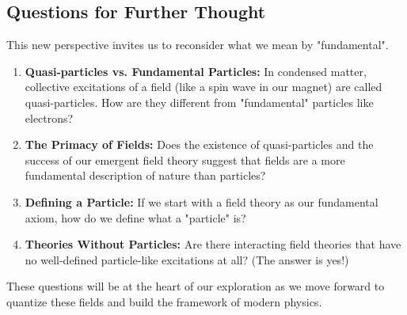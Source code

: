 \documentclass[11pt, a4paper, article]{article}
\begin{document}
\subsection{Questions for Further Thought}
This new perspective invites us to reconsider what we mean by "fundamental".
\begin{enumerate}
    \item \textbf{Quasi-particles vs. Fundamental Particles:} In condensed matter, collective excitations of a field (like a spin wave in our magnet) are called quasi-particles. How are they different from "fundamental" particles like electrons?
    \item \textbf{The Primacy of Fields:} Does the existence of quasi-particles and the success of our emergent field theory suggest that fields are a more fundamental description of nature than particles?
    \item \textbf{Defining a Particle:} If we start with a field theory as our fundamental axiom, how do we define what a "particle" is?
    \item \textbf{Theories Without Particles:} Are there interacting field theories that have no well-defined particle-like excitations at all? (The answer is yes!)
\end{enumerate}

These questions will be at the heart of our exploration as we move forward to quantize these fields and build the framework of modern physics.
\end{document}
